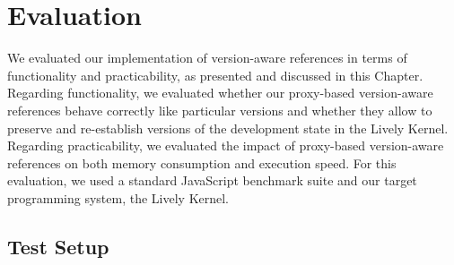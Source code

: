 \chapter{Evaluation} \label{chapter:EVALUATION}

We evaluated our implementation of version-aware references in terms of functionality and practicability, as presented and discussed in this Chapter.
Regarding functionality, we evaluated whether our proxy-based version-aware references behave correctly like particular versions and whether they allow to preserve and re-establish versions of the development state in the Lively Kernel.
Regarding practicability, we evaluated the impact of proxy-based version-aware references on both memory consumption and execution speed.
For this evaluation, we used a standard JavaScript benchmark suite and our target programming system, the Lively Kernel.

% 






\section{Test Setup}


